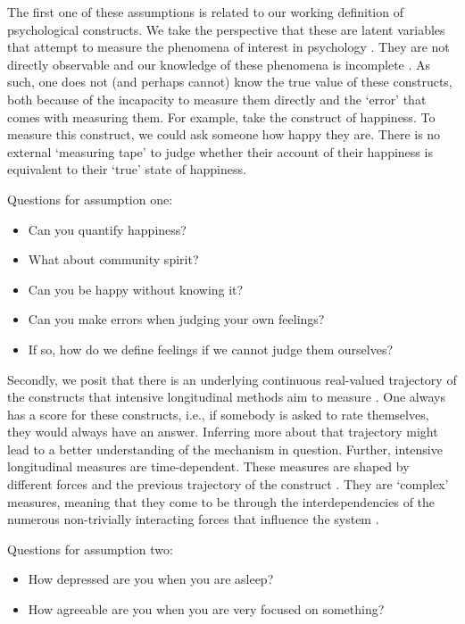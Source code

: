\documentclass[utf8]{FrontiersinVancouver}
\begin{document}
The first one of these assumptions is related to our working definition of psychological constructs. We take the perspective that these are latent variables that attempt to measure the phenomena of interest in psychology \citep{borsboomLatentVariableTheory2008}. They are not directly observable and our knowledge of these phenomena is incomplete \citep{friedWhatArePsychological2017, maraunAugustinianMethodologicalFamily2009}. As such, one does not (and perhaps cannot) know the true value of these constructs, both because of the incapacity to measure them directly and the `error' that comes with measuring them. For example, take the construct of happiness. To measure this construct, we could ask someone how happy they are. There is no external `measuring tape' to judge whether their account of their happiness is equivalent to their `true' state of happiness.

\begin{framed} 
    Questions for assumption one:
    \begin{itemize}
        \item Can you quantify happiness?
        \item What about community spirit?
        \item Can you be happy without knowing it?
        \item Can you make errors when judging your own feelings?
        \item If so, how do we define feelings if we cannot judge them ourselves?
    \end{itemize}
\end{framed}

Secondly, we posit that there is an underlying continuous real-valued trajectory of the constructs that intensive longitudinal methods aim to measure \citep{hamakerNoTimePresent2017}. One always has a score for these constructs, i.e., if somebody is asked to rate themselves, they would always have an answer. Inferring more about that trajectory might lead to a better understanding of the mechanism in question. Further, intensive longitudinal measures are time-dependent. These measures are shaped by different forces and the previous trajectory of the construct \citep{olthofComplexityPsychologicalSelfratings2020b}. They are `complex' measures, meaning that they come to be through the interdependencies of the numerous non-trivially interacting forces that influence the system \citep{olthofComplexityTheoryPsychopathology2023}. 

\begin{framed}
    Questions for assumption two:
    \begin{itemize}
        \item How depressed are you when you are asleep?
        \item How agreeable are you when you are very focused on something?
    \end{itemize}
\end{framed}
\end{document}

